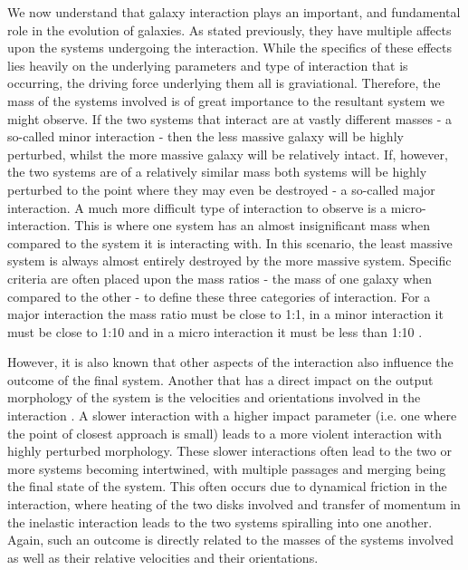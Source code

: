 We now understand that galaxy interaction plays an important, and fundamental role in the evolution of galaxies. As stated previously, they have multiple affects upon the systems undergoing the interaction. While the specifics of these effects lies heavily on the underlying parameters and type of interaction that is occurring, the driving force underlying them all is graviational. Therefore, the mass of the systems involved is of great importance to the resultant system we might observe. If the two systems that interact are at vastly different masses - a so-called minor interaction - then the less massive galaxy will be highly perturbed, whilst the more massive galaxy will be relatively intact. If, however, the two systems are of a relatively similar mass both systems will be highly perturbed to the point where they may even be destroyed - a so-called major interaction. A much more difficult type of interaction to observe is a micro-interaction. This is where one system has an almost insignificant mass when compared to the system it is interacting with. In this scenario, the least massive system is always almost entirely destroyed by the more massive system. Specific criteria are often placed upon the mass ratios - the mass of one galaxy when compared to the other - to define these three categories of interaction. For a major interaction the mass ratio must be close to 1:1, in a minor interaction it must be close to 1:10 and in a micro interaction it must be less than 1:10 \citep{A paper that states what the accepted merger ratios are?}. 

However, it is also known that other aspects of the interaction also influence the outcome of the final system. Another that has a direct impact on the output morphology of the system is the velocities and orientations involved in the interaction \citep{Some review paper, perhaps that states that these parameters are important}. A slower interaction with a higher impact parameter (i.e. one where the point of closest approach is small) leads to a more violent interaction with highly perturbed morphology. These slower interactions often lead to the two or more systems becoming intertwined, with multiple passages and merging being the final state of the system. This often occurs due to dynamical friction in the interaction, where heating of the two disks involved and transfer of momentum in the inelastic interaction leads to the two systems spiralling into one another. Again, such an outcome is directly related to the masses of the systems involved as well as their relative velocities and their orientations. 


